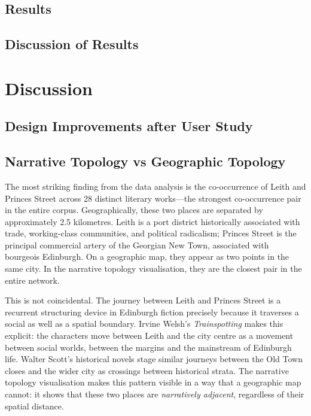 \documentclass[logo,msc]{infthesis}
\begin{document}
\section{Results}
 
\section{Discussion of Results}
 
 
\chapter{Discussion}
\label{chap:discussion}
 
\section{Design Improvements after User Study}
 
\section{Narrative Topology vs Geographic Topology}
 
The most striking finding from the data analysis is the co-occurrence of Leith and Princes Street across 28 distinct literary works---the strongest co-occurrence pair in the entire corpus. Geographically, these two places are separated by approximately 2.5 kilometres. Leith is a port district historically associated with trade, working-class communities, and political radicalism; Princes Street is the principal commercial artery of the Georgian New Town, associated with bourgeois Edinburgh. On a geographic map, they appear as two points in the same city. In the narrative topology visualisation, they are the closest pair in the entire network.
 
This is not coincidental. The journey between Leith and Princes Street is a recurrent structuring device in Edinburgh fiction precisely because it traverses a social as well as a spatial boundary. Irvine Welsh's \textit{Trainspotting} makes this explicit: the characters move between Leith and the city centre as a movement between social worlds, between the margins and the mainstream of Edinburgh life. Walter Scott's historical novels stage similar journeys between the Old Town closes and the wider city as crossings between historical strata. The narrative topology visualisation makes this pattern visible in a way that a geographic map cannot: it shows that these two places are \emph{narratively adjacent}, regardless of their spatial distance.
 
\end{document}
